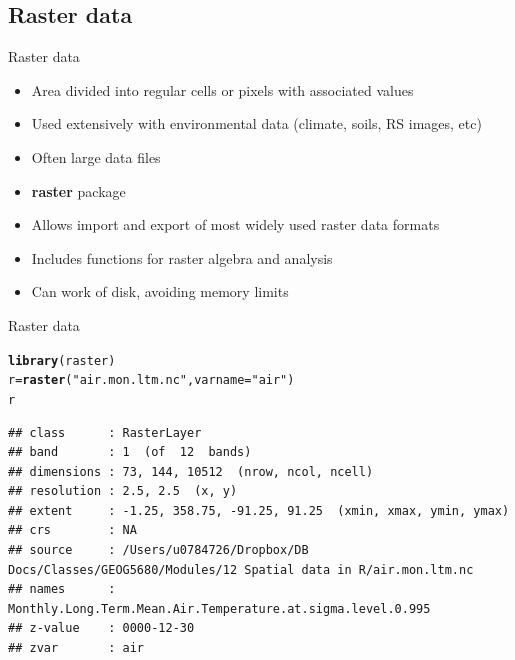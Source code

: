 \documentclass[aspectratio=169]{beamer}\usepackage[]{graphicx}\usepackage[]{color}
\makeatletter
\newcommand{\hlstr}[1]{\textcolor[rgb]{0.192,0.494,0.8}{#1}}%
\newcommand{\hlstd}[1]{\textcolor[rgb]{0.345,0.345,0.345}{#1}}%
\newcommand{\hlkwb}[1]{\textcolor[rgb]{0.69,0.353,0.396}{#1}}%
\newcommand{\hlkwc}[1]{\textcolor[rgb]{0.333,0.667,0.333}{#1}}%
\newcommand{\hlkwd}[1]{\textcolor[rgb]{0.737,0.353,0.396}{\textbf{#1}}}%
\newenvironment{kframe}{%
 \def\at@end@of@kframe{}%
 \ifinner\ifhmode%
  \def\at@end@of@kframe{\end{minipage}}%
  \begin{minipage}{\columnwidth}%
 \fi\fi%
 \def\FrameCommand##1{\hskip\@totalleftmargin \hskip-\fboxsep
 \colorbox{shadecolor}{##1}\hskip-\fboxsep
     \hskip-\linewidth \hskip-\@totalleftmargin \hskip\columnwidth}%
 \MakeFramed {\advance\hsize-\width
   \@totalleftmargin\z@ \linewidth\hsize
   \@setminipage}}%
 {\par\unskip\endMakeFramed%
 \at@end@of@kframe}
\newenvironment{knitrout}{}{} %
\makeatother
\begin{document}
\subsection{Raster data}
\begin{frame}{Raster data}
\begin{itemize}
  \item Area divided into regular cells or pixels with associated values
  \item Used extensively with environmental data (climate, soils, RS images, etc)
  \item Often large data files
	\item \textbf{raster} package
	\item Allows import and export of most widely used raster data formats
	\item Includes functions for raster algebra and analysis
	\item Can work of disk, avoiding memory limits
\end{itemize}
\end{frame}

\begin{frame}[fragile]{Raster data}
\begin{knitrout}\scriptsize
{}\color{fgcolor}\begin{kframe}
\begin{alltt}
\hlkwd{library}\hlstd{(raster)}
\hlstd{r} \hlkwb{=} \hlkwd{raster}\hlstd{(}\hlstr{"air.mon.ltm.nc"}\hlstd{,} \hlkwc{varname}\hlstd{=}\hlstr{"air"}\hlstd{)}
\hlstd{r}
\end{alltt}
\begin{verbatim}
## class      : RasterLayer 
## band       : 1  (of  12  bands)
## dimensions : 73, 144, 10512  (nrow, ncol, ncell)
## resolution : 2.5, 2.5  (x, y)
## extent     : -1.25, 358.75, -91.25, 91.25  (xmin, xmax, ymin, ymax)
## crs        : NA 
## source     : /Users/u0784726/Dropbox/DB Docs/Classes/GEOG5680/Modules/12 Spatial data in R/air.mon.ltm.nc 
## names      : Monthly.Long.Term.Mean.Air.Temperature.at.sigma.level.0.995 
## z-value    : 0000-12-30 
## zvar       : air
\end{verbatim}
\end{kframe}
\end{knitrout}
\end{frame}
\end{document}

